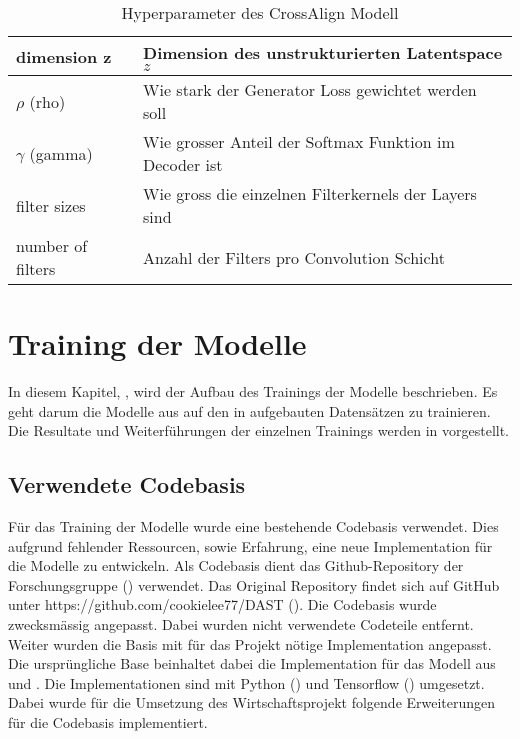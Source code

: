 \begin{table}[ht]
\begin{tabular}{| l | l |}
	dimension z             & Dimension des unstrukturierten Latentspace $z$              \\ \hline
	$\rho$ (rho)            & Wie stark der Generator Loss gewichtet werden soll          \\ \hline        
	$\gamma$ (gamma)        & Wie grosser Anteil der Softmax Funktion im Decoder ist      \\ \hline
	filter sizes            & Wie gross die einzelnen Filterkernels der Layers sind       \\ \hline
	number of filters       & Anzahl der Filters pro Convolution Schicht                  \\ \hline             
	\end{tabular}
	\caption{Hyperparameter des CrossAlign Modell}
	\label{tab:hyperparameter_cross_align}
\end{table}

\section{Training der Modelle}
\label{sec:training_der_modelle}

In diesem Kapitel, , wird der Aufbau des Trainings der Modelle beschrieben. Es geht
darum die Modelle aus  auf den in  aufgebauten Datensätzen zu
trainieren. Die Resultate und Weiterführungen der einzelnen Trainings werden in  vorgestellt.

\subsection{Verwendete Codebasis}
\label{sub:verwendete_codebasis}

Für das Training der Modelle wurde eine bestehende Codebasis verwendet. Dies aufgrund fehlender Ressourcen, sowie
Erfahrung, eine neue Implementation für die Modelle zu entwickeln. Als Codebasis dient das Github-Repository der
Forschungsgruppe (\cite{Li2019DomainAT}) verwendet. Das Original Repository findet sich auf GitHub unter
https://github.com/cookielee77/DAST (\cite{cookielee77_dast}).
\newline
\newline
Die Codebasis wurde zwecksmässig angepasst. Dabei wurden nicht verwendete Codeteile entfernt. Weiter wurden die Basis
mit für das Projekt nötige Implementation angepasst. Die ursprüngliche Base beinhaltet dabei die Implementation für das
Modell aus  und . Die Implementationen sind mit Python (\cite{python})
und Tensorflow (\cite{tensorflow}) umgesetzt. 
\newline
\newline
Dabei wurde für die Umsetzung des Wirtschaftsprojekt folgende Erweiterungen für die Codebasis implementiert.

